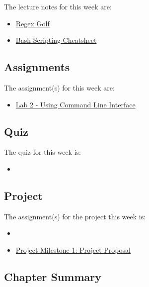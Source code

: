 \noindent The lecture notes for this week are:

\begin{itemize}
    \item \href{https://alf.nu/RegexGolf?world=regex&level=r00}{Regex Golf}
    \item \href{https://devhints.io/bash}{Bash Scripting Cheatsheet}
\end{itemize}

\subsection{Assignments}

The assignment(s) for this week are:

\begin{itemize}
    \item \href{https://github.com/cu-cspb-3308-software-dev-summer-2024/lab-1-and-2-QuantumCompiler}{Lab 2 - Using Command Line Interface}
\end{itemize}

\subsection{Quiz}

The quiz for this week is:

\begin{itemize}
    \item {}
\end{itemize}

\subsection{Project}

The assignment(s) for the project this week is:

\begin{itemize}
    \item {}
    \item \href{https://applied.cs.colorado.edu/mod/assign/view.php?id=61277}{Project Milestone 1: Project Proposal}
\end{itemize}

\subsection{Chapter Summary}

